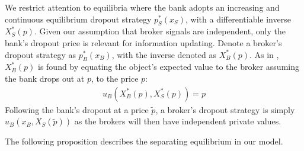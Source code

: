 \documentclass[11pt,twopage]{article}
\newtheorem{assumption}{Assumption}
{\bf}{\it}
\begin{document}
We restrict attention to equilibria where the bank adopts an
increasing and continuous equilibrium dropout strategy $p_S^*(x_S)$,
with a differentiable inverse $X_S^*(p)$. Given our assumption that
broker signals are independent, only the bank's dropout price is
relevant for information updating. Denote a broker's dropout strategy
as $p_B^*(x_B)$, with the inverse denoted as $X_B^*(p)$. As in
\cite{milgrom1982theory}, $X_B^*(p)$ is found by equating the object's
expected value to the broker assuming the bank drops out at $p$, to
the price $p$:
\begin{align}
  u_B(X_B^*(p),X_S^*(p)) = p \label{eq:ubgen}
\end{align}
Following the bank's dropout at a price $\tilde p$, a broker's dropout
strategy is simply $u_B(x_B,X_S(\tilde p))$ as the brokers will then
have independent private values.







The following proposition describes the separating equilibrium in our
model.
\end{document}
